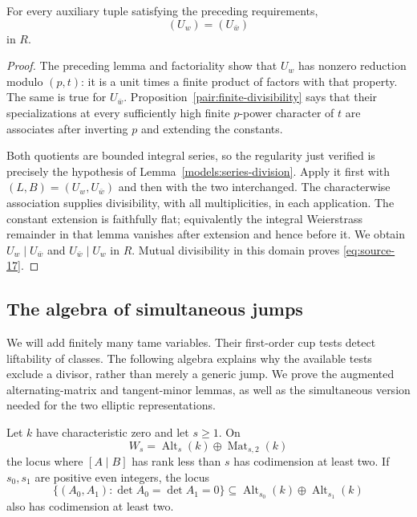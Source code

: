 \begin{lemma}\label{unit:association}
For every auxiliary tuple satisfying the preceding requirements,
\begin{equation}
                         (U_w)=(U_{\bar w})
                         \tag{17}\label{eq:source-17}
\end{equation}
in $R$.
\end{lemma}

\begin{proof}
The preceding lemma and factoriality show that $U_w$ has nonzero
reduction modulo $(p,t)$: it is a unit times a finite product of
factors with that property.  The same is true for $U_{\bar w}$.
Proposition~\ref{pair:finite-divisibility} says that their
specializations at every sufficiently high finite $p$-power
character of $t$ are associates after inverting $p$ and extending
the constants.

Both quotients are bounded integral series, so the regularity
just verified is precisely the hypothesis of
Lemma~\ref{models:series-division}.  Apply it first with
$(L,B)=(U_w,U_{\bar w})$ and then with the two interchanged.
The characterwise association supplies divisibility, with all
multiplicities, in each application.  The constant extension is
faithfully flat; equivalently the integral Weierstrass remainder
in that lemma vanishes after extension and hence before it.
We obtain $U_w\mid U_{\bar w}$ and $U_{\bar w}\mid U_w$ in $R$.
Mutual divisibility in this domain proves \eqref{eq:source-17}.
\end{proof}

\subsection{The algebra of simultaneous jumps}

We will add finitely many tame variables.  Their first-order cup
tests detect liftability of classes.  The following algebra explains
why the available tests exclude a divisor, rather than merely a
generic jump.  We prove the augmented alternating-matrix and tangent-minor
lemmas, as well as the simultaneous version needed for the two elliptic
representations.

\begin{lemma}\label{unit:augmented-alternating}
Let $k$ have characteristic zero and let $s\geq1$.  On
\[
 W_s=\operatorname{Alt}_s(k)\oplus\operatorname{Mat}_{s,2}(k)
\]
the locus where $[A\mid B]$ has rank less than $s$ has codimension
at least two.  If $s_0,s_1$ are positive even integers, the locus
\[
 \{(A_0,A_1):\det A_0=\det A_1=0\}
 \subseteq\operatorname{Alt}_{s_0}(k)\oplus
             \operatorname{Alt}_{s_1}(k)
\]
also has codimension at least two.
\end{lemma}

